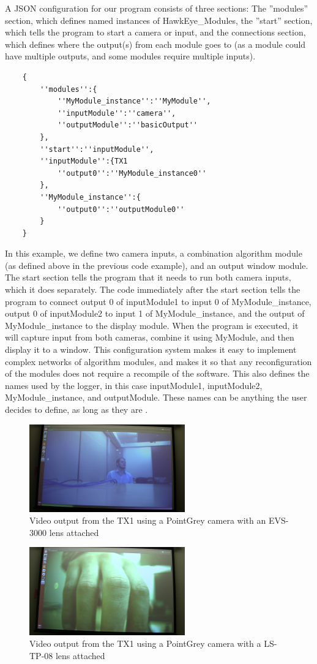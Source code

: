 \documentclass[letterpaper,10pt,titlepage]{IEEEtran}
\begin{document}
\par
A JSON configuration for our program consists of three sections: The ''modules'' section, which defines named instances of HawkEye\_Modules, the ''start'' section, which tells the program to start a camera or input, and the connections section, which defines where the output(s) from each module goes to (as a module could have multiple outputs, and some modules require multiple inputs).\\
   \begin{lstlisting}
   	{
		''modules'':{
			''MyModule_instance'':''MyModule'',
			''inputModule'':''camera'',
			''outputModule'':''basicOutput''
		},
		''start'':''inputModule'',
		''inputModule'':{TX1
			''output0'':''MyModule_instance0''
		},
		''MyModule_instance'':{
			''output0'':''outputModule0''
		}
	}
   \end{lstlisting}
 \par 
   In this example, we define two camera inputs, a combination algorithm module (as defined above in the previous code example), and an output window module. The start section tells the program that it needs to run both camera inputs, which it does separately. The code immediately after the start section tells the program to connect output 0 of inputModule1 to input 0 of MyModule\_instance, output 0 of inputModule2 to input 1 of MyModule\_instance, and the output of MyModule\_instance to the display module. When the program is executed, it will capture input from both cameras, combine it using MyModule, and then display it to a window. This configuration system makes it easy to implement complex networks of algorithm modules, and makes it so that any reconfiguration of the modules does not require a recompile of the software. This also defines the names used by the logger, in this case inputModule1, inputModule2, MyModule\_instance, and outputModule. These names can be anything the user decides to define, as long as they are .
\begin{figure}[!ht]
  \caption{Video output from the TX1 using a PointGrey camera with an EVS-3000 lens attached}
	  \centering
		    \includegraphics[width=0.6\textwidth]{images/vlcsnap-2016-02-11-17h42m53s150.png}
				\end{figure}
\begin{figure}[!ht]
  \caption{Video output from the TX1 using a PointGrey camera with a LS-TP-08 lens attached}
	  \centering
		    \includegraphics[width=0.6\textwidth]{images/vlcsnap-2016-02-11-17h42m30s486.png}
				\end{figure}

   
\end{document}
